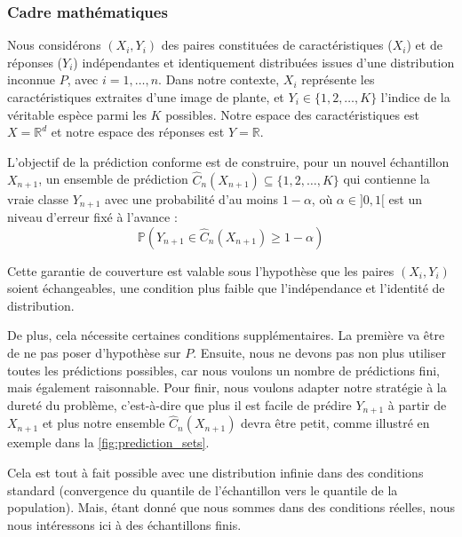 \documentclass[a4paper,12pt]{article}
\begin{document}
\subsubsection{Cadre mathématiques}

Nous considérons $(X_i, Y_i)$ des paires constituées de caractéristiques ($X_i$) et de réponses ($Y_i$) indépendantes et identiquement distribuées issues d'une distribution inconnue $P$, avec $i = 1, \dots, n$. Dans notre contexte, $X_i$ représente les caractéristiques extraites d'une image de plante, et $Y_i \in \{1, 2, \dots, K\}$ l'indice de la véritable espèce parmi les $K$ possibles. Notre espace des caractéristiques est $X = \mathbb R^d$ et notre espace des réponses est $Y = \mathbb R$.

\vspace{0.2cm}

L'objectif de la prédiction conforme est de construire, pour un nouvel échantillon $X_{n+1}$, un ensemble de prédiction $\hat{C}_n(X_{n+1}) \subseteq \{1, 2, \dots, K\}$ qui contienne la vraie classe $Y_{n+1}$ avec une probabilité d'au moins $1 - \alpha$, où $\alpha \in ]0,1[$ est un niveau d'erreur fixé à l'avance : 
$$ \mathbb P(Y_{n+1} \in \hat C_n (X_{n+1}) \geq 1 - \alpha) $$

\vspace{0.2cm}

Cette garantie de couverture est valable sous l'hypothèse que les paires $(X_i, Y_i)$ soient échangeables, une condition plus faible que l'indépendance et l'identité de distribution.

\vspace{0.2cm}

De plus, cela nécessite certaines conditions supplémentaires. La première va être de ne pas poser d'hypothèse sur $P$. Ensuite, nous ne devons pas non plus utiliser toutes les prédictions possibles, car nous voulons un nombre de prédictions fini, mais également raisonnable. Pour finir, nous voulons adapter notre stratégie à la dureté du problème, c'est-à-dire que plus il est facile de prédire $Y_{n+1}$ à partir de $X_{n+1}$ et plus notre ensemble $\hat C_n(X_{n+1})$ devra être petit, comme illustré en exemple dans la \autoref{fig:prediction_sets}.

\vspace{0.2cm}

Cela est tout à fait possible avec une distribution infinie dans des conditions standard (convergence du quantile de l'échantillon vers le quantile de la population). Mais, étant donné que nous sommes dans des conditions réelles, nous nous intéressons ici à des échantillons finis.
\end{document}
